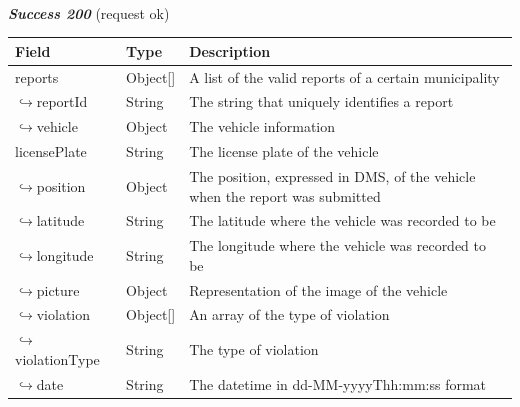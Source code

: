 						\paragraph{}
							\textcolor{myGreen}{\textit{\textbf{Success 200}}} (request ok)
							\vspace{-2mm}
							\begin{table}[!h]
								\begin{tabular}{L{0.3\textwidth}L{0.15\textwidth}L{0.43\textwidth}}
									\toprule
									\textbf{Field} & \textbf{Type} & \textbf{Description} \\
									\midrule
									reports & Object[] & A list of the valid reports of a certain municipality \\
									\hspace{2.5mm}$\hookrightarrow$reportId & String & The string that uniquely identifies a report \\
									\hspace{2.5mm}$\hookrightarrow$vehicle & Object & The vehicle information \\
									\hspace{5mm}licensePlate & String & The license plate of the vehicle \\
									\hspace{2.5mm}$\hookrightarrow$position & Object & The position, expressed in DMS, of the vehicle when the report was submitted  \\
									\hspace{6.5mm}$\hookrightarrow$latitude & String & The latitude where the vehicle was recorded to be \\
									\hspace{6.5mm}$\hookrightarrow$longitude & String & The longitude where the vehicle was recorded to be \\
									\hspace{2.5mm}$\hookrightarrow$picture & Object & Representation of the image of the vehicle \\
									\hspace{2.5mm}$\hookrightarrow$violation & Object[] & An array of the type of violation \\
									\hspace{6.5mm}$\hookrightarrow$violationType & String & The type of violation \\
									\hspace{2.5mm}$\hookrightarrow$date & String & The datetime in \newline dd-MM-yyyyThh:mm:ss format \\
								 	\bottomrule
								\end{tabular}
							\end{table}
						\clearpage
